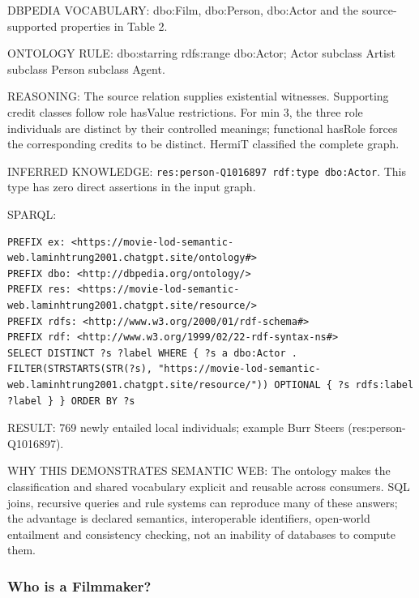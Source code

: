 \documentclass[
  11pt,
]{article}
\begin{document}
DBPEDIA VOCABULARY: dbo:Film, dbo:Person, dbo:Actor and the
source-\allowbreak{}s\allowbreak{}upported\allowbreak{} properties in
Table 2.

ONTOLOGY RULE: dbo:starring rdfs:range dbo:Actor; Actor subclass Artist
subclass Person subclass Agent.

REASONING: The source relation supplies existential witnesses.
Supporting credit classes follow role hasValue
restrict\allowbreak{}ions.\allowbreak{} For min 3, the three role
individuals are distinct by their controlled meanings; functional
hasRole forces the correspo\allowbreak{}nding credits to be distinct.
HermiT classified the complete graph.

INFERRED KNOWLEDGE:
\texttt{res:\allowbreak{}pers\allowbreak{}on-\allowbreak{}\allowbreak{}Q1016\allowbreak{}897 rdf:\allowbreak{}type dbo\allowbreak{}:\allowbreak{}\allowbreak{}Actor}.
This type has zero direct assertions in the input graph.

SPARQL:

\begin{verbatim}
PREFIX ex: <https://movie-lod-semantic-web.laminhtrung2001.chatgpt.site/ontology#>
PREFIX dbo: <http://dbpedia.org/ontology/>
PREFIX res: <https://movie-lod-semantic-web.laminhtrung2001.chatgpt.site/resource/>
PREFIX rdfs: <http://www.w3.org/2000/01/rdf-schema#>
PREFIX rdf: <http://www.w3.org/1999/02/22-rdf-syntax-ns#>
SELECT DISTINCT ?s ?label WHERE { ?s a dbo:Actor . FILTER(STRSTARTS(STR(?s), "https://movie-lod-semantic-web.laminhtrung2001.chatgpt.site/resource/")) OPTIONAL { ?s rdfs:label ?label } } ORDER BY ?s
\end{verbatim}

RESULT: 769 newly entailed local individuals; example Burr Steers
(res:\allowbreak{}per\allowbreak{}son-\allowbreak{}\allowbreak{}Q101\allowbreak{}6897).\allowbreak{}

WHY THIS DEMONSTRATES SEMANTIC WEB: The ontology makes the
classifi\allowbreak{}cation and shared vocabulary explicit and reusable
across consumers. SQL joins, recursive queries and rule systems can
reproduce many of these answers; the advantage is declared semantics,
interope\allowbreak{}rable identifiers, open-world entailment and
consistency checking, not an inability of databases to compute them.

\subsubsection{Who is a Filmmaker?}\label{who-is-a-filmmaker}
\end{document}
